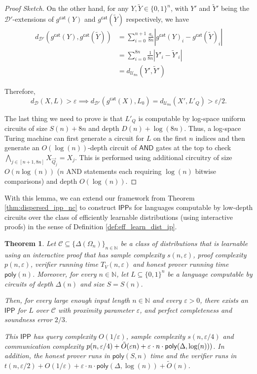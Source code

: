 \documentclass[10pt,a4paper]{article}
\newtheorem{theorem}{Theorem}[section]
\newcommand{\poly}{\mathsf{poly}}
\newcommand{\IPP}{\mathsf{IPP}}
\newcommand{\N}{\mathbb{N}}
\newcommand{\sU}{\mathcal{U}}
\newcommand{\sD}{\mathcal{D}}
\begin{document}
\begin{proof}[Proof Sketch]
On the other hand, for any $Y,\widetilde{Y} \in \{0,1\}^{n}$, with $Y'$ and $\widetilde{Y}'$ being the $\sD'$-extensions of $g^{\mathsf{cat}}(Y)$  and $g^{\mathsf{cat}}(\widetilde{Y})$ respectively, we have 
\[
\begin{split}
    d_{\sD'}(g^{\mathsf{cat}}(Y),g^{\mathsf{cat}}(\widetilde{Y}))&=\sum_{i=0}^{n+1}\frac{a_{i}}{8n}|g^{\mathsf{cat}}(Y)_{i}-g^{\mathsf{cat}}(\widetilde{Y})_{i}|\\
    &=\sum_{i=0}^{8n}\frac{1}{8n}|Y'_{i}-\widetilde{Y}'_{i}|\\
    &=d_{\sU_{8n}}(Y',\widetilde{Y}')
\end{split}
\]

\noindent Therefore,
\begin{equation*}
    d_{\sD}(X,L)>\varepsilon\implies d_{\sD'}(g^{\mathsf{cat}}(X),L_{0})=d_{\sU_{8n}}(X',L'_Q)>\varepsilon/2.
\end{equation*}

The last thing we need to prove is that $L'_Q$ is computable by log-space uniform circuits of size $S(n)+8n$ and depth $D(n)+\log(8n)$. 
Thus, a log-space Turing machine can first generate a circuit for $L$ on the first $n$ indices and then generate an $O(\log (n))$-depth circuit of $\mathsf{AND}$ gates at the top to check $\bigwedge_{j\in[n+1,8n]}X_{\vec{Q}_{j}}=X_{j}$. This is performed using additional circuitry of size $O(n\log (n))$ ($n$ AND statements each requiring $\log (n)$ bitwise comparisons) and depth $O(\log (n))$. 
\end{proof}

With this lemma, we can extend our framework from Theorem \ref{thm:dispersed_ipp_nc} to construct $\IPP$s for languages computable by low-depth circuits over the class of efficiently learnable distributions (using interactive proofs) in the sense of Definition \ref{def:eff_learn_dist_ip}.
\begin{theorem}
\label{thm:dfIPPLearnable}
    Let $\mathcal{C}\subseteq \{\Delta(\Omega_n)\}_{n \in \mathbb{N}}$ be a class of distributions that is learnable using an interactive proof that has sample complexity $s(n,\varepsilon)$, proof complexity $p(n,\varepsilon)$, verifier running time $T_V(n,\varepsilon)$ and honest prover running time $\poly(n)$. Moreover, for every $n \in \N$, let $L \subseteq \{0,1\}^{n}$ be a language computable by circuits of depth $\Delta(n)$ and size $S=S(n)$.

    Then, for every large enough input length $n \in \N$ and every $\varepsilon > 0$, there exists an $\IPP$ for $L$ over $\mathcal{C}$ with proximity parameter $\varepsilon$, and perfect completeness and soundness error $2/3$.
    
    This $\IPP$ has query complexity $O(1/\varepsilon)$, sample complexity $s(n,\varepsilon/4)$ and communication complexity $p(n,\varepsilon/4)+\Tilde{O}(\varepsilon n)+\varepsilon\cdot n\cdot \poly(\Delta,\log(n)))$. In addition, the honest prover runs in $\poly(S,n)$ time and the verifier runs in $t(n,\varepsilon/2)+O(1/\varepsilon)+\varepsilon\cdot n\cdot \poly(\Delta,\log(n))+\tilde{O}(n)$.
\end{theorem}
\end{document}

